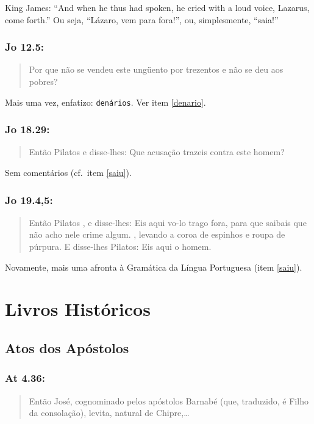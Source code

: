 King James: ``And when he thus had spoken, he cried with a loud voice,
Lazarus, come forth.'' Ou seja, ``Lázaro, vem para fora!'', ou, simplesmente, ``saia!''

\subsection*{Jo 12.5:}
\begin{quote}
    \small
Por que não se vendeu este ungüento por trezentos  e não se deu aos pobres?
\end{quote}

Mais uma vez, enfatizo: \texttt{denários}. Ver item \ref{denario}.


\subsection*{Jo 18.29:}
\begin{quote}
    \small
Então Pilatos  e disse-lhes: Que acusação trazeis contra este homem?
\end{quote}

Sem comentários (cf.~item \ref{saiu}).

\subsection*{Jo 19.4,5:}
\begin{quote}
    \small
Então Pilatos , e disse-lhes: Eis aqui vo-lo trago fora, para que saibais que não acho nele crime algum. , levando a coroa de espinhos e roupa de púrpura. E disse-lhes Pilatos: Eis aqui o homem.
\end{quote}

Novamente, mais uma afronta à Gra\-má\-tica da Lín\-gua Por\-tu\-gue\-sa (i\-tem \ref{saiu}).

\chapter{Livros Históricos}
\section{Atos dos Apóstolos}

\subsection*{At 4.36:}
\begin{quote}
    \small
Então José, cognominado pelos apóstolos\uwave{,} Barnabé (que, traduzido, é Filho da consolação), levita, natural de Chipre,\ldots
\end{quote}

